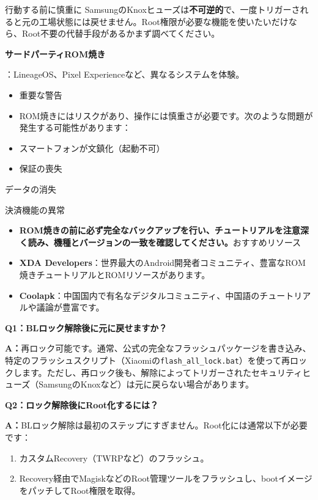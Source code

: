 \begin{tcbwarn}{行動する前に慎重に}
SamsungのKnoxヒューズは\textbf{不可逆的}で、一度トリガーされると元の工場状態には戻せません。Root権限が必要な機能を使いたいだけなら、Root不要の代替手段があるかまず調べてください。

\end{tcbwarn}

\textbf{サードパーティROM焼き}\par

：LineageOS、Pixel Experienceなど、異なるシステムを体験。

\begin{itemize}
  \item 重要な警告
  \item ROM焼きにはリスクがあり、操作には慎重さが必要です。次のような問題が発生する可能性があります：
  \item スマートフォンが文鎮化（起動不可）
  \item 保証の喪失
\end{itemize}

データの消失

\begin{tcbinfo}{決済機能の異常}
\begin{itemize}
  \item \textbf{ROM焼きの前に必ず完全なバックアップを行い、チュートリアルを注意深く読み、機種とバージョンの一致を確認してください。}おすすめリソース
  \item \textbf{XDA Developers}：世界最大のAndroid開発者コミュニティ、豊富なROM焼きチュートリアルとROMリソースがあります。
  \item \textbf{Coolapk}：中国国内で有名なデジタルコミュニティ、中国語のチュートリアルや議論が豊富です。
\end{itemize}

\end{tcbinfo}


\textbf{Q1：BLロック解除後に元に戻せますか？}\par

\textbf{A：}再ロック可能です。通常、公式の完全なフラッシュパッケージを書き込み、特定のフラッシュスクリプト（Xiaomiの\texttt{flash\_all\_lock.\allowbreak bat}）を使って再ロックします。ただし、再ロック後も、解除によってトリガーされたセキュリティヒューズ（SamsungのKnoxなど）は元に戻らない場合があります。

\textbf{Q2：ロック解除後にRoot化するには？}\par

\textbf{A：}BLロック解除は最初のステップにすぎません。Root化には通常以下が必要です：

\begin{enumerate}
  \item カスタムRecovery（TWRPなど）のフラッシュ。
  \item Recovery経由でMagiskなどのRoot管理ツールをフラッシュし、bootイメージをパッチしてRoot権限を取得。
\end{enumerate}
